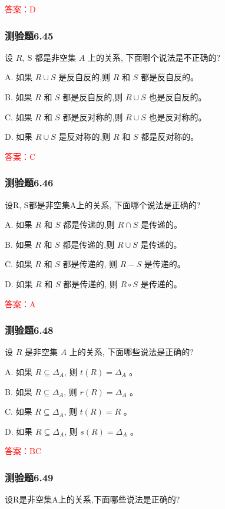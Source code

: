 \documentclass[UTF8, heading=true]{ctexart}
\begin{document}
\textcolor{red}{答案：D}

\subsubsection{测验题6.45}

设 $R, \mathrm{~S}$ 都是非空集 $A$ 上的关系, 下面哪个说法是不正确的?

A. 如果 $R \cup S$ 是反自反的,则 $R$ 和 $S$ 都是反自反的。

B. 如果 $R$ 和 $S$ 都是反自反的,则 $R \cup S$ 也是反自反的。

C. 如果 $R$ 和 $S$ 都是反对称的,则 $R \cup S$ 也是反对称的。

D. 如果 $R \cup S$ 是反对称的,则 $R$ 和 $S$ 都是反对称的。

\textcolor{red}{答案：C}


\subsubsection{测验题6.46}

设R, S都是非空集A上的关系, 下面哪个说法是正确的?

A. 
如果 $R$ 和 $S$ 都是传递的,则 $R \cap S$ 是传递的。

B. 
如果 $R$ 和 $S$ 都是传递的,则 $R \cup S$ 是传递的。

C. 
如果 $R$ 和 $S$ 都是传递的, 则 $R-S$ 是传递的。

D. 
如果 $R$ 和 $S$ 都是传递的, 则 $R \circ S$ 是传递的。

\textcolor{red}{答案：A}

\subsubsection{测验题6.48}

设 $R$ 是非空集 $A$ 上的关系, 下面哪些说法是正确的?

A. 如果 $R \subseteq \Delta_A$, 则 $t(R)=\Delta_A$ 。

B. 
如果 $R \subseteq \Delta_A$, 则 $r(R)=\Delta_A$ 。

C. 
如果 $R \subseteq \Delta_A$, 则 $t(R)=R$ 。

D. 
如果 $R \subseteq \Delta_A$, 则 $s(R)=\Delta_A$ 。

\textcolor{red}{答案：BC}

\subsubsection{测验题6.49}
设R是非空集A上的关系,下面哪些说法是正确的?
\end{document}
